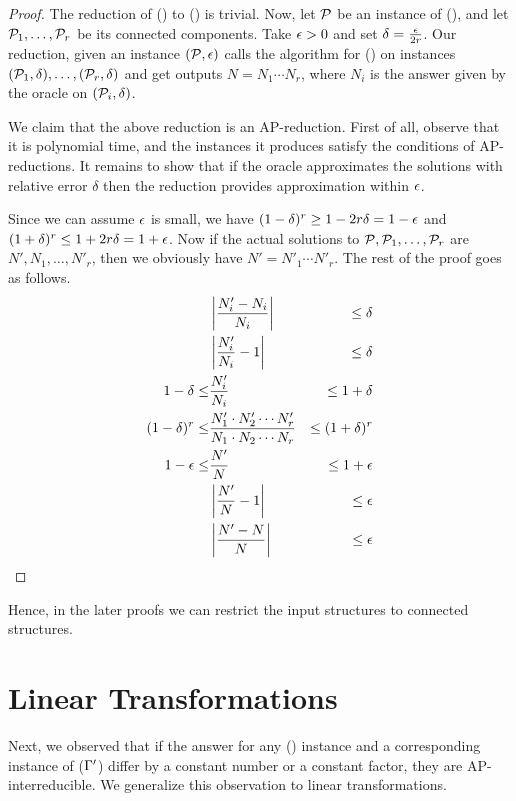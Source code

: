 \begin{proof}
The reduction of \cccsp(\mrelset) to \ccsp(\mrelset) is trivial. Now, let \(\mathcal{P}\) be an instance of
\ccsp(\mrelset), and let \(\mathcal{P}_1,\dotsc,\mathcal{P}_r\) be its connected components. Take \(\epsilon > 0\) 
and set \(\delta = \frac{\epsilon}{2r}\)\@. Our reduction, given an instance \((\mathcal{P},\epsilon)\) calls
the algorithm for \cccsp(\mrelset) on instances \((\mathcal{P}_1,\delta), \dotsc,(\mathcal{P}_r,\delta)\) 
and get outputs \(N = N_1 \dotsm N_r\),
where \(N_i\) is the answer given by the oracle on \((\mathcal{P}_i,\delta)\)\@.

We claim that the above reduction is an AP-reduction. First of all, observe that it is polynomial
time, and the instances it produces satisfy the conditions of AP-reductions. It remains to show
that if the oracle approximates the solutions with relative error \(\delta\) then the reduction 
provides approximation within \(\epsilon\)\@.

Since we can assume \(\epsilon\) is small, we have \((1 - \delta)^r \ge 1 - 2r\delta = 1 - \epsilon \) and
\( ( 1 + \delta)^r \le 1 + 2r\delta = 1 + \epsilon\)\@. Now if 
the actual solutions to \(\mathcal{P}, \mathcal{P}_1,\dotsc,\mathcal{P}_r\) are \(N',N_1,\dotsc,N'_r\), then 
we obviously have \(N'=N'_1\dotsm N'_r\)\@. The rest of the proof goes as follows.
\begin{eqnarray*}
&\left|\frac{N'_i - N_i}{N_i}\right| &\le \delta \\
&\left|\frac{N'_i}{N_i} -1 \right| &\le \delta \\
1 - \delta  \le &\frac{N'_i}{N_i} &\le 1 + \delta \\
(1-\delta)^r \le &\frac{N'_1\cdot N'_2 \dotsm N'_r}{N_1\cdot N_2 \dotsm N_r} &\le (1 + \delta)^r \\
1-\epsilon \le &\frac{N'}{N} &\le 1+\epsilon \\
&\left|\frac{N'}{N}-1\right|&\le \epsilon\\
&\left|\frac{N'-N}{N}\right|&\le \epsilon\\
\end{eqnarray*}
\end{proof}
Hence, in the later proofs we can restrict the input structures to connected structures.
\section{Linear Transformations}
Next, we observed that if the answer for any \ccsp(\mrelset) instance and a corresponding
instance of \ccsp(\(\Gamma'\)) differ by a constant number or a constant factor,
they are AP-interreducible. We generalize this observation to linear transformations. 

